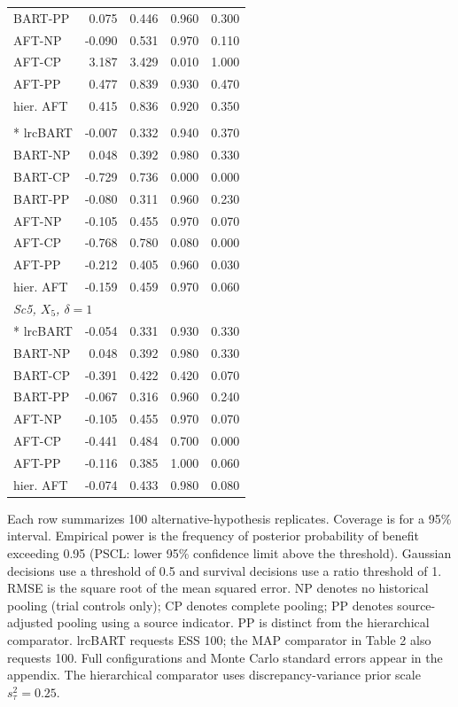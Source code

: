 \begin{longtable}{lrrrr}
BART-PP & 0.075 & 0.446 & 0.960 & 0.300 \\
AFT-NP & -0.090 & 0.531 & 0.970 & 0.110 \\
AFT-CP & 3.187 & 3.429 & 0.010 & 1.000 \\
AFT-PP & 0.477 & 0.839 & 0.930 & 0.470 \\
hier. AFT & 0.415 & 0.836 & 0.920 & 0.350 \\
\newpage
\multicolumn{5}{l}{\strut\textit{Sc4, $\delta=1$}}\\*
lrcBART & -0.007 & 0.332 & 0.940 & 0.370 \\
BART-NP & 0.048 & 0.392 & 0.980 & 0.330 \\
BART-CP & -0.729 & 0.736 & 0.000 & 0.000 \\
BART-PP & -0.080 & 0.311 & 0.960 & 0.230 \\
AFT-NP & -0.105 & 0.455 & 0.970 & 0.070 \\
AFT-CP & -0.768 & 0.780 & 0.080 & 0.000 \\
AFT-PP & -0.212 & 0.405 & 0.960 & 0.030 \\
hier. AFT & -0.159 & 0.459 & 0.970 & 0.060 \\
\multicolumn{5}{l}{\strut\textit{Sc5, $X_5$, $\delta=1$}}\\*
lrcBART & -0.054 & 0.331 & 0.930 & 0.330 \\
BART-NP & 0.048 & 0.392 & 0.980 & 0.330 \\
BART-CP & -0.391 & 0.422 & 0.420 & 0.070 \\
BART-PP & -0.067 & 0.316 & 0.960 & 0.240 \\
AFT-NP & -0.105 & 0.455 & 0.970 & 0.070 \\
AFT-CP & -0.441 & 0.484 & 0.700 & 0.000 \\
AFT-PP & -0.116 & 0.385 & 1.000 & 0.060 \\
hier. AFT & -0.074 & 0.433 & 0.980 & 0.080 \\
\end{longtable}
\noindent\begin{minipage}{\linewidth}\footnotesize Each row summarizes 100 alternative-hypothesis replicates. Coverage is for a 95\% interval. Empirical power is the frequency of posterior probability of benefit exceeding 0.95 (PSCL: lower 95\% confidence limit above the threshold). Gaussian decisions use a threshold of 0.5 and survival decisions use a ratio threshold of 1. RMSE is the square root of the mean squared error. NP denotes no historical pooling (trial controls only); CP denotes complete pooling; PP denotes source-adjusted pooling using a source indicator. PP is distinct from the hierarchical comparator. lrcBART requests ESS 100; the MAP comparator in Table 2 also requests 100. Full configurations and Monte Carlo standard errors appear in the appendix. The hierarchical comparator uses discrepancy-variance prior scale $s_\tau^2=0.25$.\end{minipage}
\endgroup

